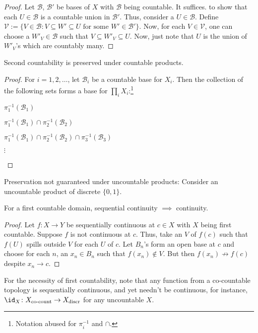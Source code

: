 	\begin{proof}
		Let $\mathscr B$, $\mathscr B'$ be bases of $X$ with $\mathscr B$ being countable. It suffices.
		to show that each $U\in\mathscr B$ is a countable union in $\mathscr B'$. Thus, consider a $U\in\mathscr B$.
		Define $\mathscr V:= \{V\in\mathscr B : V\subseteq W'\subseteq U \text{ for some } W'\in\mathscr B'\}$. Now, for each $V\in\mathscr V$, one can choose
		a $W'_V\in\mathscr B$ such that $V\subseteq W'_V\subseteq U$. Now, just note that $U$ is the union of $W'_V$'s which are countably many.
	\end{proof}
	
	
	\begin{prp}
		Second countability is preserved under countable products.
	\end{prp}
	
	\begin{proof}
		For $i = 1, 2, \ldots$, let $\mathscr B_i$ be a countable base for $X_i$. Then the collection of the following sets forms a base for $\prod_i X_i$:\footnote{Notation abused for $\pi_i^{-1}$ and $\cap$.}
		\begin{mylist}
			\item $\pi_1^{-1}(\mathscr B_1)$
			\item $\pi_1^{-1}(\mathscr B_1)\cap\pi_2^{-1}(\mathscr B_2)$
			\item $\pi_1^{-1}(\mathscr B_1)\cap\pi_2^{-1}(\mathscr B_2)\cap\pi_3^{-1}(\mathscr B_3)$
			\item[$\vdots$]\qedhere
		\end{mylist}
	\end{proof}
	
	\begin{rmk}
		Preservation not guaranteed under uncountable products: Consider an uncountable product of discrete $\{0, 1\}$.
	\end{rmk}
	
	
	\begin{prp}
		For a first countable domain, sequential continuity $\implies$ continuity.
	\end{prp}
	
	\begin{proof}
		Let $f\colon X\to Y$ be sequentially continuous at $c\in X$ with $X$ being first countable. Suppose $f$ is not continuous at $c$. Thus, take an \onbd $V$ of $f(c)$ such that $f(U)$ spills outside $V$ for each \onbd $U$ of $c$. Let $B_n$'s form an open base at $c$ and choose for each $n$,
		an $x_n\in B_n$ such that $f(x_n)\notin V$. But then $f(x_n)\not\to f(c)$ despite $x_n\to c$.
	\end{proof}
	
	\begin{rmk}
		For the necessity of first countability, note that any function from a co-countable topology is sequentially continuous, and yet needn't be continuous, for instance, $\id_X\colon X_\text{co-count}\to X_\text{discr}$ for any uncountable $X$.
	\end{rmk}